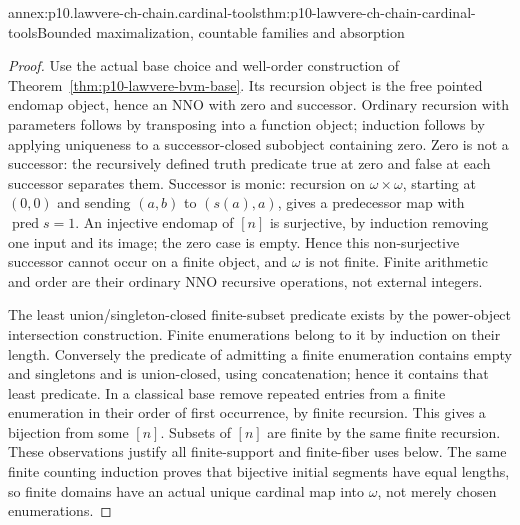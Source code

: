 \begin{annexitem}{annex:p10.lawvere-ch-chain.cardinal-tools}{thm:p10-lawvere-ch-chain-cardinal-tools}{Bounded maximalization, countable families and absorption}
\begin{proof}
Use the actual base choice and well-order construction of
Theorem~\ref{thm:p10-lawvere-bvm-base}. Its recursion object is the
free pointed endomap object, hence an NNO with zero and successor.
Ordinary recursion with parameters follows by transposing into a function
object; induction follows by applying uniqueness to a successor-closed
subobject containing zero. Zero is not a successor: the recursively
defined truth predicate true at zero and false at each successor separates
them. Successor is monic: recursion on \(\omega\times\omega\), starting
at \((0,0)\) and sending \((a,b)\) to \((s(a),a)\), gives a predecessor
map with \(\operatorname{pred}s=1\). An injective endomap of \([n]\)
is surjective, by induction removing one input and its image; the
zero case is empty. Hence this non-surjective successor cannot occur
on a finite object, and \(\omega\) is not finite.
Finite arithmetic and order are their ordinary NNO recursive operations,
not external integers.

The least union/singleton-closed finite-subset predicate exists by the
power-object intersection construction. Finite enumerations belong to it
by induction on their length. Conversely the predicate of admitting a
finite enumeration contains empty and singletons and is union-closed,
using concatenation; hence it contains that least predicate. In a
classical base remove repeated entries from a finite enumeration in their
order of first occurrence, by finite recursion. This gives a bijection
from some \([n]\). Subsets of \([n]\) are finite by the same finite
recursion. These observations justify all finite-support and finite-fiber
uses below.
The same finite counting induction proves that bijective initial segments
have equal lengths, so finite domains have an actual unique cardinal
map into \(\omega\), not merely chosen enumerations.


\end{proof}
\end{annexitem}
